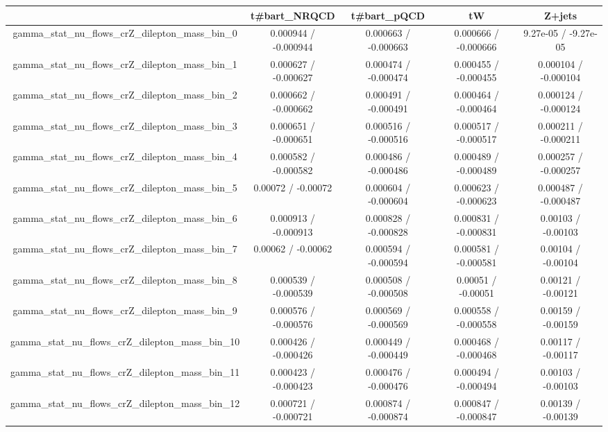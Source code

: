\documentclass[10pt]{article}
\begin{document}
\begin{table}[htbp]
\begin{center}
\begin{tabular}{|c|c|c|c|c|}
\hline 
      & t#bar{t}_{NRQCD}      & t#bar{t}_{pQCD}      & tW      & Z+jets \\ 
\hline 
  gamma_stat_nu_flows_crZ_dilepton_mass_bin_0 & 0.000944 / -0.000944 & 0.000663 / -0.000663 & 0.000666 / -0.000666 & 9.27e-05 / -9.27e-05 \\ 
  gamma_stat_nu_flows_crZ_dilepton_mass_bin_1 & 0.000627 / -0.000627 & 0.000474 / -0.000474 & 0.000455 / -0.000455 & 0.000104 / -0.000104 \\ 
  gamma_stat_nu_flows_crZ_dilepton_mass_bin_2 & 0.000662 / -0.000662 & 0.000491 / -0.000491 & 0.000464 / -0.000464 & 0.000124 / -0.000124 \\ 
  gamma_stat_nu_flows_crZ_dilepton_mass_bin_3 & 0.000651 / -0.000651 & 0.000516 / -0.000516 & 0.000517 / -0.000517 & 0.000211 / -0.000211 \\ 
  gamma_stat_nu_flows_crZ_dilepton_mass_bin_4 & 0.000582 / -0.000582 & 0.000486 / -0.000486 & 0.000489 / -0.000489 & 0.000257 / -0.000257 \\ 
  gamma_stat_nu_flows_crZ_dilepton_mass_bin_5 & 0.00072 / -0.00072 & 0.000604 / -0.000604 & 0.000623 / -0.000623 & 0.000487 / -0.000487 \\ 
  gamma_stat_nu_flows_crZ_dilepton_mass_bin_6 & 0.000913 / -0.000913 & 0.000828 / -0.000828 & 0.000831 / -0.000831 & 0.00103 / -0.00103 \\ 
  gamma_stat_nu_flows_crZ_dilepton_mass_bin_7 & 0.00062 / -0.00062 & 0.000594 / -0.000594 & 0.000581 / -0.000581 & 0.00104 / -0.00104 \\ 
  gamma_stat_nu_flows_crZ_dilepton_mass_bin_8 & 0.000539 / -0.000539 & 0.000508 / -0.000508 & 0.00051 / -0.00051 & 0.00121 / -0.00121 \\ 
  gamma_stat_nu_flows_crZ_dilepton_mass_bin_9 & 0.000576 / -0.000576 & 0.000569 / -0.000569 & 0.000558 / -0.000558 & 0.00159 / -0.00159 \\ 
  gamma_stat_nu_flows_crZ_dilepton_mass_bin_10 & 0.000426 / -0.000426 & 0.000449 / -0.000449 & 0.000468 / -0.000468 & 0.00117 / -0.00117 \\ 
  gamma_stat_nu_flows_crZ_dilepton_mass_bin_11 & 0.000423 / -0.000423 & 0.000476 / -0.000476 & 0.000494 / -0.000494 & 0.00103 / -0.00103 \\ 
  gamma_stat_nu_flows_crZ_dilepton_mass_bin_12 & 0.000721 / -0.000721 & 0.000874 / -0.000874 & 0.000847 / -0.000847 & 0.00139 / -0.00139 \\ 

\end{tabular}
\end{center}
\end{table}
\end{document}
